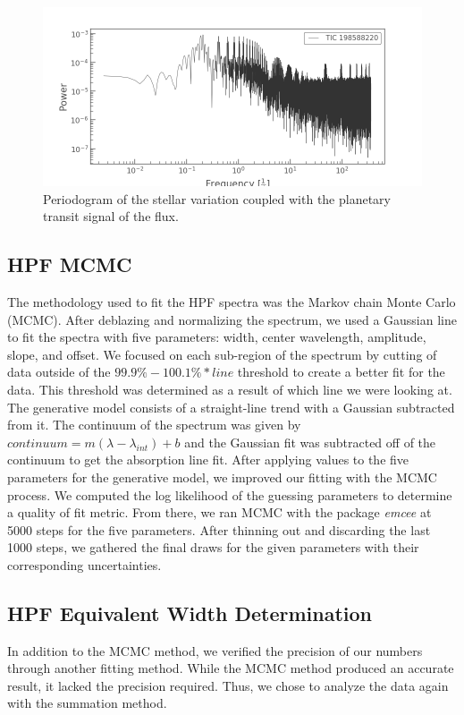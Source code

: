 \documentclass[modern]{aastex631}
\begin{document}
\begin{figure}
    \includegraphics[width=\linewidth]{figures/planetary_periodogram.png}
    \caption{Periodogram of the stellar variation coupled with the planetary transit signal of the flux. }
    \label{fig:planetary_periodogram}
\end{figure}

\subsection{HPF MCMC}
The methodology used to fit the HPF spectra was the Markov chain Monte Carlo (MCMC). After deblazing and normalizing the spectrum, we used a Gaussian line to fit the spectra with five parameters: width, center wavelength, amplitude, slope, and offset.  We focused on each sub-region of the spectrum by cutting of data outside of the $99.9\%-100.1\%*line$ threshold to create a better fit for the data. This threshold was determined as a result of which line we were looking at. The generative model consists of a straight-line trend with a Gaussian subtracted from it. The continuum of the spectrum was given by $continuum=m(\lambda-\lambda_{int})+b$ and the Gaussian fit was subtracted off of the continuum to get the absorption line fit. After applying values to the five parameters for the generative model, we improved our fitting with the MCMC process. We computed the log likelihood of the guessing parameters to determine a quality of fit metric. From there, we ran MCMC with the package \textit{emcee} at 5000 steps for the five parameters. After thinning out and discarding the last 1000 steps, we gathered the final draws for the given parameters with their corresponding uncertainties.

\subsection{HPF Equivalent Width Determination}
In addition to the MCMC method, we verified the precision of our numbers through another fitting method. While the MCMC method produced an accurate result, it lacked the precision required. Thus, we chose to analyze the data again with the summation method.
\end{document}

